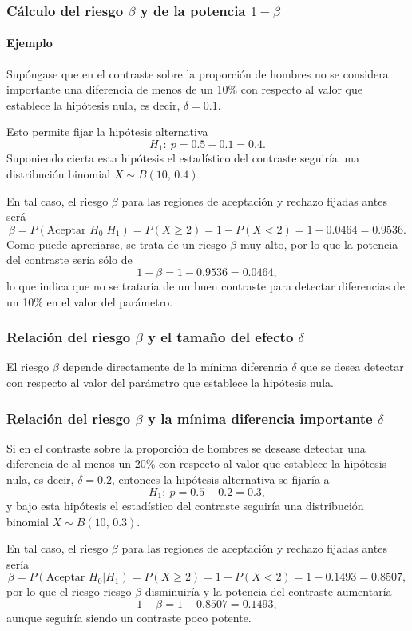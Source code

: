 \begin{frame}
\frametitle{Cálculo del riesgo $\beta$ y de la potencia $1-\beta$}
\framesubtitle{Ejemplo}
Supóngase que en el contraste sobre la proporción de hombres no se considera importante una diferencia de menos de un 10\% con respecto al valor que establece la hipótesis nula, es decir, $\delta=0.1$.

Esto permite fijar la hipótesis alternativa
\[
H_1:\ p=0.5-0.1=0.4.
\]
Suponiendo cierta esta hipótesis el estadístico del contraste seguiría una distribución binomial $X\sim B(10,\,0.4)$.

En tal caso, el riesgo $\beta$ para las regiones de aceptación y rechazo fijadas antes será
\[
\beta = P(\text{Aceptar }H_0|H_1) = P(X\geq 2) = 1 - P(X<2) = 1-0.0464 = 0.9536.
\]
Como puede apreciarse, se trata de un riesgo $\beta$ muy alto, por lo que la potencia del contraste sería sólo de
\[
1-\beta = 1-0.9536 = 0.0464,
\]
lo que indica que no se trataría de un buen contraste para detectar diferencias de un 10\% en el valor del parámetro.
\end{frame}


\begin{frame}
\frametitle{Relación del riesgo $\beta$ y el tamaño del efecto $\delta$}
El riesgo $\beta$ depende directamente de la mínima diferencia $\delta$ que se desea detectar con respecto al valor del
parámetro que establece la hipótesis nula.
\begin{center}
\end{center}
\end{frame}


\begin{frame}
\frametitle{Relación del riesgo $\beta$ y la mínima diferencia importante $\delta$}
Si en el contraste sobre la proporción de hombres se desease detectar una diferencia de al menos un 20\% con respecto al valor que establece la hipótesis nula, es decir, $\delta=0.2$, entonces la hipótesis alternativa se fijaría a 
\[
H_1:\ p=0.5-0.2=0.3,
\]
y bajo esta hipótesis el estadístico del contraste seguiría una distribución binomial $X\sim B(10,\,0.3)$.

En tal caso, el riesgo $\beta$ para las regiones de aceptación y rechazo fijadas antes sería
\[
\beta = P(\text{Aceptar }H_0|H_1) = P(X\geq 2) = 1 - P(X<2) = 1-0.1493 = 0.8507,
\]
por lo que el riesgo riesgo $\beta$ disminuiría y la potencia del contraste aumentaría
\[
1-\beta = 1-0.8507 = 0.1493,
\]
aunque seguiría siendo un contraste poco potente.
\end{frame}


